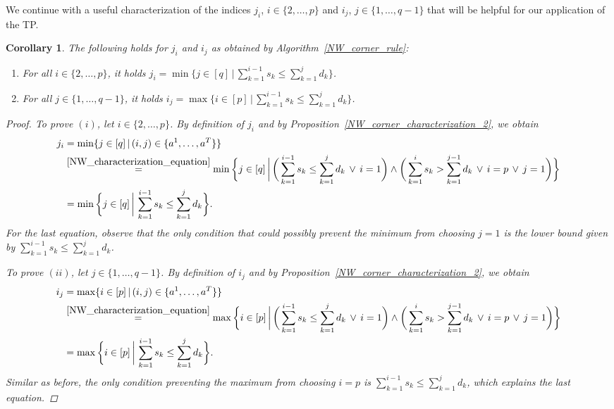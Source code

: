 \documentclass[letterpaper]{article}
\newtheorem{corollary}[theorem]{Corollary}
\begin{document}
We continue with a useful characterization of the indices $j_i$, $i \in \{2, \dots, p\}$ and $i_j$, $j \in \{1, \dots, q-1\}$ that will be helpful for our application of the TP.
\begin{corollary}\label{corollary_get_indices}
    The following holds for $j_i$ and $i_j$ as obtained by Algorithm~\ref{NW_corner_rule}:
    \begin{enumerate}
        \item[(i)] For all $i \in \{2, \dots, p\}$, it holds $j_i = \min \{ j \in [q] \, | \, \sum_{k = 1}^{i-1} s_k \leq \sum_{k = 1}^{j} d_k \}$. 
        \item[(ii)] For all $j \in \{1, \dots, q-1\}$, it holds $i_j = \max \{ i \in [p] \, | \, \sum_{k = 1}^{i-1} s_k \leq \sum_{k = 1}^{j} d_k \}$.
    \end{enumerate}
    \begin{proof}
        To prove $(i)$, let $i \in \{2, \dots, p\}$. By definition of $j_i$ and by Proposition~\ref{NW_corner_characterization_2}, we obtain
        {\allowdisplaybreaks
        \begin{align*}
            j_i &= \min \{j \in [q] \, | \, (i,j) \in \{a^1, \dots, a^T\}\} \\
            &\overset{\eqref{NW_characterization_equation}}{=} \min \bigg\{j \in [q] \, \bigg| \, \bigg( \sum_{k=1}^{i-1} s_k \leq \sum_{k=1}^{j} d_k \, \lor \, i = 1 \bigg) \land \bigg( \sum_{k=1}^{i} s_k > \sum_{k=1}^{j-1} d_k \, \lor \, i = p \, \lor \, j = 1 \bigg) \bigg\} \\
            &= \min \bigg\{j \in [q] \, \bigg| \, \sum_{k=1}^{i-1} s_k \leq \sum_{k=1}^{j} d_k \bigg\}.
        \end{align*}
        }
        For the last equation, observe that the only condition that could possibly prevent the minimum from choosing $j = 1$ is the lower bound given by $\sum_{k=1}^{i-1} s_k \leq \sum_{k=1}^{j} d_k$. 

        To prove $(ii)$, let $j \in \{1, \dots, q-1\}$. By definition of $i_j$ and by Proposition~\ref{NW_corner_characterization_2}, we obtain
        {\allowdisplaybreaks
        \begin{align*}
            i_j &= \max \{i \in [p] \, | \, (i,j) \in \{a^1, \dots, a^T\}\} \\
            &\overset{\eqref{NW_characterization_equation}}{=} \max \bigg\{i \in [p] \, \bigg| \, \bigg( \sum_{k=1}^{i-1} s_k \leq \sum_{k=1}^{j} d_k \, \lor \, i = 1 \bigg) \land \bigg( \sum_{k=1}^{i} s_k > \sum_{k=1}^{j-1} d_k \, \lor \, i = p \, \lor \, j = 1 \bigg) \bigg\} \\
            &= \max \bigg\{i \in [p] \, \bigg| \, \sum_{k=1}^{i-1} s_k \leq \sum_{k=1}^{j} d_k \bigg\}.
        \end{align*}
        }
        Similar as before, the only condition preventing the maximum from choosing $i = p$ is $\sum_{k=1}^{i-1} s_k \leq \sum_{k=1}^{j} d_k$, which explains the last equation.
    \end{proof}
\end{corollary}
\end{document}
